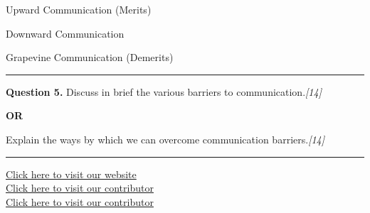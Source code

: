 \documentclass[11pt,a4paper]{article}
\newcommand{\pts}[1]{\hfill   \textit{[#1]}}
\begin{document}
\begin{parts}
  \item Upward Communication (Merits)
  \item Downward Communication
  \item Grapevine Communication (Demerits)
\end{parts}

\medskip\rule{\linewidth}{0.2pt}




\noindent   \textbf{Question 5.}
Discuss in brief the various barriers to communication.\pts{14}

\centerline{   \textbf{OR}}

Explain the ways by which we can overcome communication barriers.\pts{14}

\vfill
\rule{\linewidth}{0.4pt}

\begin{center}\small
\href{https://bhu-exam.vercel.app/}{Click here to visit our website}\\[4pt]
\href{https://me-aryan.vercel.app/}{Click here to visit our contributor}\\[4pt]
\href{https://quashan-me.vercel.app/}{Click here to visit our contributor}
\end{center}
\end{document}
